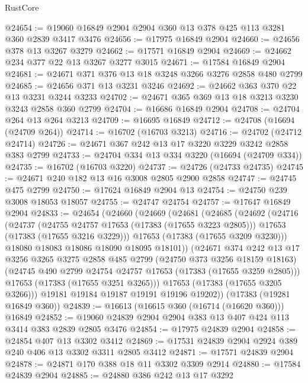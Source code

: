 \begin{lexlean}{RustCore}
\begin{coremodule}
@24654 := @19060 @16849 @2904 @2904 @360 @13 @378 @425 @113 @3281 @360 @2839 @3417 @3476
@24656 := @17975 @16849 @2904
@24660 := @24656 @378 @13 @3267 @3279
@24662 := @17571 @16849 @2904
@24669 := @24662 @234 @377 @22 @13 @3267 @3277 @3015
@24671 := @17584 @16849 @2904
@24681 := @24671 @371 @376 @13 @18 @3248 @3266 @3276 @2858 @480 @2799
@24685 := @24656 @371 @13 @3231 @3246
@24692 := @24662 @363 @370 @22 @13 @3231 @3244 @3233
@24702 := @24671 @365 @369 @13 @18 @3213 @3230 @3243 @2858 @360 @2799
@24704 := @16686 @16849 @2904
@24708 := @24704 @264 @13 @264 @3213
@24709 := @16695 @16849
@24712 := @24708 (@16694 (@24709 @264))
@24714 := @16702 (@16703 @3213)
@24716 := @24702 (@24712 @24714)
@24726 := @24671 @367 @242 @13 @17 @3220 @3229 @3242 @2858 @383 @2799
@24733 := @24704 @334 @13 @334 @3220 (@16694 (@24709 @334))
@24735 := @16702 (@16703 @3220)
@24737 := @24726 (@24733 @24735)
@24745 := @24671 @240 @182 @13 @16 @3008 @2805 @2900 @2858
@24747 := @24745 @475 @2799
@24750 := @17624 @16849 @2904 @13
@24754 := @24750 @239 @3008 @18053 @18057
@24755 := @24747 @24754
@24757 := @17647 @16849 @2904
@24833 := @24654
    (@24660
      (@24669
        (@24681
          (@24685
            (@24692
              (@24716
                (@24737
                  (@24755 @24757 @17653 (@17383 (@17655 @3223 @2805)))
                  @17653
                  (@17383 (@17655 @3216 @3229)))
                @17653
                (@17383 (@17655 @3209 @3230)))
              @18080
              @18083
              @18086
              @18090
              @18095
              @18101))
          (@24671
            @374
            @242
            @13
            @17
            @3256
            @3265
            @3275
            @2858
            @485
            @2799
            (@24750 @373 @3256 @18159 @18163)
            (@24745 @490 @2799 @24754 @24757 @17653 (@17383 (@17655 @3259 @2805)))
            @17653
            (@17383 (@17655 @3251 @3265)))
          @17653
          (@17383 (@17655 @3205 @3266)))
        @19181
        @19184
        @19187
        @19191
        @19196
        @19202))
    (@17383 (@19281 @16849 @360))
@24839 := @16613 (@16615 @360 (@16714 (@16620 @360))) @16849
@24852 := @19060 @24839 @2904 @2904 @383 @13 @407 @424 @113 @3414 @383 @2839 @2805 @3476
@24854 := @17975 @24839 @2904
@24858 := @24854 @407 @13 @3302 @3412
@24869 := @17531 @24839 @2904 @2924 @389 @240 @406 @13 @3302 @3311 @2805 @3412
@24871 := @17571 @24839 @2904
@24878 := @24871 @170 @388 @18 @11 @3302 @3309 @2914
@24880 := @17584 @24839 @2904
@24885 := @24880 @386 @242 @13 @17 @3292

\end{coremodule}
\end{lexlean}
